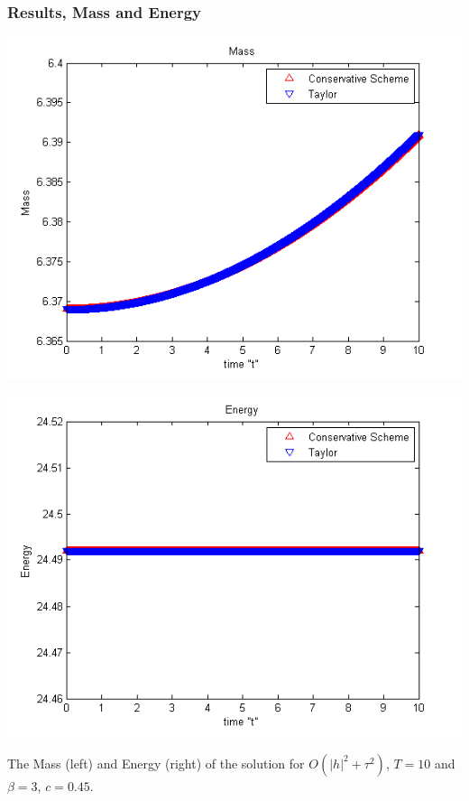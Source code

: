 \documentclass{beamer}
\begin{document}
\begin{frame}
\frametitle{Results, Mass and Energy}

\begin{center}\vspace{0.4cm}
	\begin{minipage}[b]{0.45\linewidth}
		 \includegraphics[width=\linewidth]{figures/Mass_bt3_c045_h005.png}
	\end{minipage}	
	\begin{minipage}[b]{0.45\linewidth}
		\includegraphics[width=\linewidth]{figures/Energy_bt3_c045_h005.png}
		
	\end{minipage}
\end{center}
The Mass (left) and Energy (right) of the solution for $O(|h|^2 + \tau^2)$, $T = 10$ and $\beta=3$, $c = 0.45$.
\end{frame}
\end{document}
